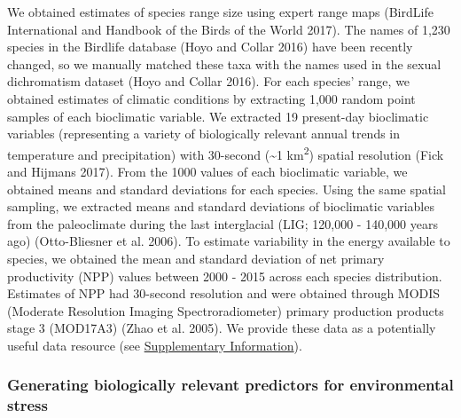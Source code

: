 \documentclass[]{article}
\begin{document}
We obtained estimates of species range size using expert range maps
(BirdLife International and Handbook of the Birds of the World 2017).
The names of 1,230 species in the Birdlife database (Hoyo and Collar
2016) have been recently changed, so we manually matched these taxa with
the names used in the sexual dichromatism dataset (Hoyo and Collar
2016). For each species' range, we obtained estimates of climatic
conditions by extracting 1,000 random point samples of each bioclimatic
variable. We extracted 19 present-day bioclimatic variables
(representing a variety of biologically relevant annual trends in
temperature and precipitation) with 30-second (\textasciitilde{}1
km\textsuperscript{2}) spatial resolution (Fick and Hijmans 2017). From
the 1000 values of each bioclimatic variable, we obtained means and
standard deviations for each species. Using the same spatial sampling,
we extracted means and standard deviations of bioclimatic variables from
the paleoclimate during the last interglacial (LIG; 120,000 - 140,000
years ago) (Otto-Bliesner et al. 2006). To estimate variability in the
energy available to species, we obtained the mean and standard deviation
of net primary productivity (NPP) values between 2000 - 2015 across each
species distribution. Estimates of NPP had 30-second resolution and were
obtained through MODIS (Moderate Resolution Imaging Spectroradiometer)
primary production products stage 3 (MOD17A3) (Zhao et al. 2005). We
provide these data as a potentially useful data resource (see
\href{https://justincally.github.io/SexualSelection_Speciation/}{Supplementary Information}).

\hypertarget{generating-biologically-relevant-predictors-for-environmental-stress}{%
\subsubsection{Generating biologically relevant predictors for
environmental
stress}\label{generating-biologically-relevant-predictors-for-environmental-stress}}
\end{document}
